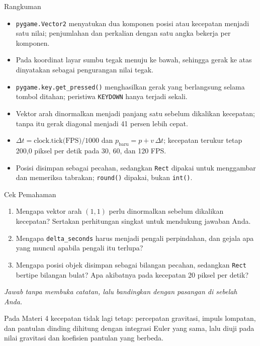 \documentclass[aspectratio=169,10pt]{beamer}
\begin{document}
\begin{frame}{Rangkuman}
\begin{itemize}
  \item \texttt{pygame.Vector2} menyatukan dua komponen posisi atau kecepatan
        menjadi satu nilai; penjumlahan dan perkalian dengan satu angka bekerja
        per komponen.
  \item Pada koordinat layar sumbu tegak menuju ke bawah, sehingga gerak ke atas
        dinyatakan sebagai pengurangan nilai tegak.
  \item \texttt{pygame.key.get\_pressed()} menghasilkan gerak yang berlangsung
        selama tombol ditahan; peristiwa \texttt{KEYDOWN} hanya terjadi sekali.
  \item Vektor arah dinormalkan menjadi panjang satu sebelum dikalikan kecepatan;
        tanpa itu gerak diagonal menjadi 41 persen lebih cepat.
  \item $\Delta t = \text{clock.tick(FPS)}/1000$ dan
        $p_{\text{baru}} = p + v\,\Delta t$; kecepatan terukur tetap 200,0
        piksel per detik pada 30, 60, dan 120 FPS.
  \item Posisi disimpan sebagai pecahan, sedangkan \texttt{Rect} dipakai untuk
        menggambar dan memeriksa tabrakan; \texttt{round()} dipakai, bukan
        \texttt{int()}.
\end{itemize}
\end{frame}

\begin{frame}{Cek Pemahaman}
\begin{enumerate}
  \item Mengapa vektor arah $(1, 1)$ perlu dinormalkan sebelum dikalikan
        kecepatan? Sertakan perhitungan singkat untuk mendukung jawaban Anda.
  \item Mengapa \texttt{delta\_seconds} harus menjadi pengali perpindahan, dan
        gejala apa yang muncul apabila pengali itu terlupa?
  \item Mengapa posisi objek disimpan sebagai bilangan pecahan, sedangkan
        \texttt{Rect} bertipe bilangan bulat? Apa akibatnya pada kecepatan
        20 piksel per detik?
\end{enumerate}
\vspace{0.35cm}
{\footnotesize\color{ubMuted}\itshape Jawab tanpa membuka catatan, lalu
bandingkan dengan pasangan di sebelah Anda.}
\end{frame}

  {Pada Materi 4 kecepatan tidak lagi tetap: percepatan \mbox{gravitasi},
   impuls lompatan, dan pantulan dinding dihitung dengan integrasi Euler yang
   sama, lalu \mbox{diuji} pada nilai \mbox{gravitasi} dan koefisien pantulan
   yang berbeda.}
\end{document}
